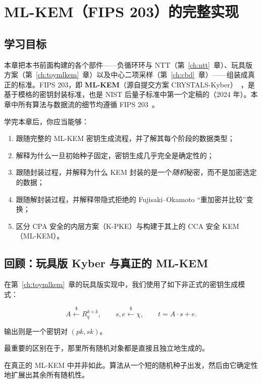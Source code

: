 \chapter{ML-KEM（FIPS 203）的完整实现}
\label{ch:fips203}

\section{学习目标}

本章把本书前面构建的各个部件——负循环环与 NTT（第~\ref{ch:ntt}~章）、玩具版方案（第~\ref{ch:toymlkem}~章）以及中心二项采样（第~\ref{ch:cbd}~章）——组装成真正的标准。FIPS 203，即 \textbf{ML-KEM}（源自提交方案 CRYSTALS-Kyber）~\cite{fips203,kyber2018}，是基于模格的密钥封装标准，也是 NIST 后量子标准中第一个定稿的（2024 年）。本章中所有算法与数据流的细节均遵循 FIPS 203~\cite{fips203}。

学完本章后，你应当能够：

\begin{enumerate}
  \item 跟随完整的 ML-KEM 密钥生成流程，并了解其每个阶段的数据类型；
  \item 解释为什么一旦初始种子固定，密钥生成几乎完全是确定性的；
  \item 跟随封装过程，并解释为什么 KEM 封装的是一个\emph{随机}秘密，而不是加密选定的数据；
  \item 跟随解封装过程，并解释带隐式拒绝的 Fujisaki--Okamoto “重加密并比较”变换；
  \item 区分 CPA 安全的内层方案（K-PKE）与构建于其上的 CCA 安全 KEM（ML-KEM）。
\end{enumerate}

\section{回顾：玩具版 Kyber 与真正的 ML-KEM}

在第~\ref{ch:toymlkem}~章的玩具版实现中，我们使用了如下非正式的密钥生成模式：

\[
A \xleftarrow{\$} R_q^{k\times k}, \qquad s,e \xleftarrow{\$} \chi, \qquad t = A\cdot s + e.
\]

输出则是一个密钥对 \((pk, sk)\)。

最重要的区别在于，那里所有随机对象都是直接且独立地生成的。

在真正的 ML-KEM 中并非如此。算法从一个短的随机种子出发，然后由它确定性地扩展出其余所有随机性。

